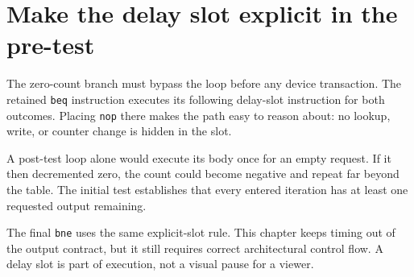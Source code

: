 \section{Make the delay slot explicit in the
  pre-test}\label{005-seven-segment-counter-p05-make-the-delay-slot-explicit-in-the-pre-test}

The zero-count branch must bypass the loop before any device
transaction. The retained \texttt{beq} instruction executes its
following delay-slot instruction for both outcomes. Placing \texttt{nop}
there makes the path easy to reason about: no lookup, write, or counter
change is hidden in the slot.

A post-test loop alone would execute its body once for an empty request.
If it then decremented zero, the count could become negative and repeat
far beyond the table. The initial test establishes that every entered
iteration has at least one requested output remaining.

The final \texttt{bne} uses the same explicit-slot rule. This chapter
keeps timing out of the output contract, but it still requires correct
architectural control flow. A delay slot is part of execution, not a
visual pause for a viewer.
